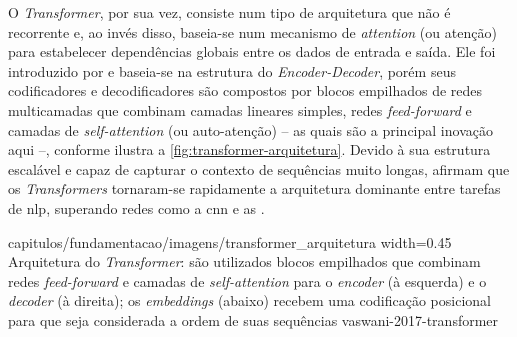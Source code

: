 O \textit{Transformer}, por sua vez, consiste num tipo de arquitetura que não é recorrente e, ao invés disso, baseia-se num mecanismo de \textit{attention} (ou atenção) para estabelecer dependências globais entre os dados de entrada e saída.
Ele foi introduzido por  e baseia-se na estrutura do \textit{Encoder-Decoder}, porém seus codificadores e decodificadores são compostos por blocos empilhados de redes multicamadas que combinam camadas lineares simples, redes \textit{feed-forward} e camadas de \textit{self-attention} (ou auto-atenção) -- as quais são a principal inovação aqui --, conforme ilustra a \autoref{fig:transformer-arquitetura}.
Devido à sua estrutura escalável e capaz de capturar o contexto de sequências muito longas,  afirmam que os \textit{Transformers} tornaram-se rapidamente a arquitetura dominante entre tarefas de \acrshort{nlp}, superando redes como a \acrfull{cnn} e as .

{capitulos/fundamentacao/imagens/transformer_arquitetura}
{width=0.45\textwidth}
{Arquitetura do \textit{Transformer}: são utilizados blocos empilhados que combinam redes \textit{feed-forward} e camadas de \textit{self-attention} para o \textit{encoder} (à esquerda) e o \textit{decoder} (à direita); os \textit{embeddings} (abaixo) recebem uma codificação posicional para que seja considerada a ordem de suas sequências}
{vaswani-2017-transformer}







